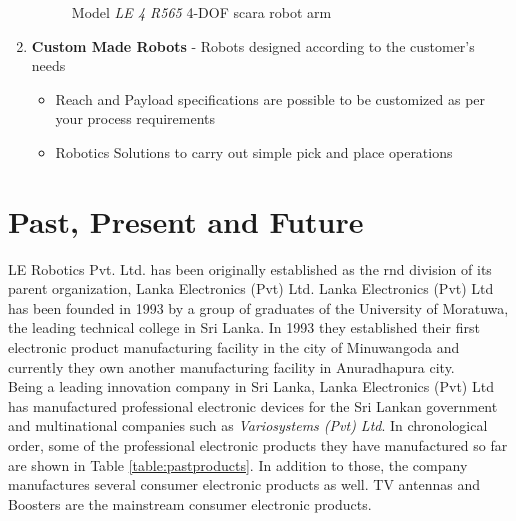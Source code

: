 \documentclass[a4paper,12pt]{report}%
\begin{document}
\begin{enumerate}
	\begin{figure}[h]
		\centering
		\caption{Model \textit{LE 4 R565} 4-DOF \ac{scara} robot arm\cite{scara_robots}}
		\label{fig:fourdofrobot}
	\end{figure}
	
	
	
	\item \textbf{Custom Made Robots} - Robots designed according to the customer's needs
	\begin{itemize}
		\item Reach and Payload specifications are possible to be customized as per your process requirements
		\item Robotics Solutions to carry out simple pick and place operations
	\end{itemize}
\end{enumerate}

\section{Past, Present and Future}

LE Robotics Pvt. Ltd. has been originally established as the \ac{rnd} division of its parent organization, Lanka Electronics (Pvt) Ltd. Lanka Electronics (Pvt) Ltd has been founded in 1993  by a group of graduates of the University of Moratuwa, the leading technical college in Sri Lanka. In 1993 they established their first electronic product manufacturing facility in the city of Minuwangoda and currently they own another manufacturing facility in Anuradhapura city.\\

Being a leading innovation company in Sri Lanka, Lanka Electronics (Pvt) Ltd has manufactured professional electronic devices for the Sri Lankan government and multinational companies such as \textit{Variosystems (Pvt) Ltd}. In chronological order, some of the professional electronic products they have manufactured so far are shown in Table \ref{table:pastproducts}. In addition to those, the company manufactures several consumer electronic products as well. TV antennas and Boosters are the mainstream consumer electronic products.
\end{document}
